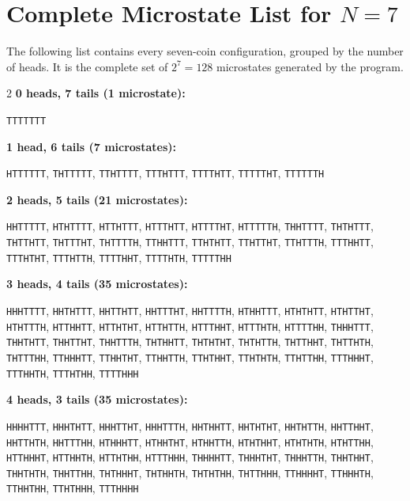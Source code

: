 \documentclass[10pt,a4paper]{article}
\begin{document}
\section{Complete Microstate List for \texorpdfstring{$N=7$}{N=7}}
\label{app:microstates}
The following list contains every seven-coin configuration, grouped by the number of heads. It is the complete set of $2^7=128$ microstates generated by the program.
\small
\setlength{\parskip}{1pt}
\begin{multicols}{2}
\noindent\textbf{0 heads, 7 tails (1 microstate):}\par
\texttt{TTTTTTT}\par
\vspace{2pt}
\noindent\textbf{1 head, 6 tails (7 microstates):}\par
\texttt{HTTTTTT}, \texttt{THTTTTT}, \texttt{TTHTTTT}, \texttt{TTTHTTT}, \texttt{TTTTHTT}, \texttt{TTTTTHT}, \texttt{TTTTTTH}\par
\vspace{2pt}
\noindent\textbf{2 heads, 5 tails (21 microstates):}\par
\texttt{HHTTTTT}, \texttt{HTHTTTT}, \texttt{HTTHTTT}, \texttt{HTTTHTT}, \texttt{HTTTTHT}, \texttt{HTTTTTH}, \texttt{THHTTTT}, \texttt{THTHTTT}, \texttt{THTTHTT}, \texttt{THTTTHT}, \texttt{THTTTTH}, \texttt{TTHHTTT}, \texttt{TTHTHTT}, \texttt{TTHTTHT}, \texttt{TTHTTTH}, \texttt{TTTHHTT}, \texttt{TTTHTHT}, \texttt{TTTHTTH}, \texttt{TTTTHHT}, \texttt{TTTTHTH}, \texttt{TTTTTHH}\par
\vspace{2pt}
\noindent\textbf{3 heads, 4 tails (35 microstates):}\par
\texttt{HHHTTTT}, \texttt{HHTHTTT}, \texttt{HHTTHTT}, \texttt{HHTTTHT}, \texttt{HHTTTTH}, \texttt{HTHHTTT}, \texttt{HTHTHTT}, \texttt{HTHTTHT}, \texttt{HTHTTTH}, \texttt{HTTHHTT}, \texttt{HTTHTHT}, \texttt{HTTHTTH}, \texttt{HTTTHHT}, \texttt{HTTTHTH}, \texttt{HTTTTHH}, \texttt{THHHTTT}, \texttt{THHTHTT}, \texttt{THHTTHT}, \texttt{THHTTTH}, \texttt{THTHHTT}, \texttt{THTHTHT}, \texttt{THTHTTH}, \texttt{THTTHHT}, \texttt{THTTHTH}, \texttt{THTTTHH}, \texttt{TTHHHTT}, \texttt{TTHHTHT}, \texttt{TTHHTTH}, \texttt{TTHTHHT}, \texttt{TTHTHTH}, \texttt{TTHTTHH}, \texttt{TTTHHHT}, \texttt{TTTHHTH}, \texttt{TTTHTHH}, \texttt{TTTTHHH}\par
\vspace{2pt}
\noindent\textbf{4 heads, 3 tails (35 microstates):}\par
\texttt{HHHHTTT}, \texttt{HHHTHTT}, \texttt{HHHTTHT}, \texttt{HHHTTTH}, \texttt{HHTHHTT}, \texttt{HHTHTHT}, \texttt{HHTHTTH}, \texttt{HHTTHHT}, \texttt{HHTTHTH}, \texttt{HHTTTHH}, \texttt{HTHHHTT}, \texttt{HTHHTHT}, \texttt{HTHHTTH}, \texttt{HTHTHHT}, \texttt{HTHTHTH}, \texttt{HTHTTHH}, \texttt{HTTHHHT}, \texttt{HTTHHTH}, \texttt{HTTHTHH}, \texttt{HTTTHHH}, \texttt{THHHHTT}, \texttt{THHHTHT}, \texttt{THHHTTH}, \texttt{THHTHHT}, \texttt{THHTHTH}, \texttt{THHTTHH}, \texttt{THTHHHT}, \texttt{THTHHTH}, \texttt{THTHTHH}, \texttt{THTTHHH}, \texttt{TTHHHHT}, \texttt{TTHHHTH}, \texttt{TTHHTHH}, \texttt{TTHTHHH}, \texttt{TTTHHHH}\par

\end{multicols}
\end{document}
